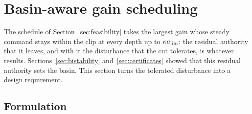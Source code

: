 \section{Basin-aware gain scheduling}\label{sec:basin-aware}

The schedule of Section~\ref{sec:feasibility} takes the largest gain whose steady command stays within the clip at every depth up to $\kappa a_{\lim}$; the residual authority that it leaves, and with it the disturbance that the cut tolerates, is whatever results. Sections~\ref{sec:bistability} and~\ref{sec:certificates} showed that this residual authority sets the basin. This section turns the tolerated disturbance into a design requirement.

\subsection{Formulation}\label{sec:ba-form}

